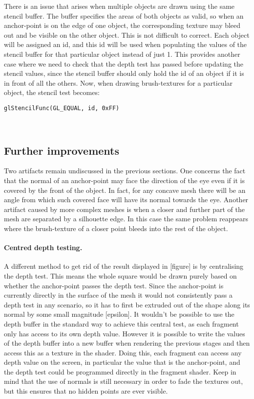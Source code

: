 \documentclass[a4paper, 12pt]{article}
\begin{document}
There is an issue that arises when multiple objects are drawn using the same stencil buffer. The buffer specifies the areas of both objects as valid, so when an anchor-point is on the edge of one object, the corresponding texture may bleed out and be visible on the other object. This is not difficult to correct. Each object will be assigned an id, and this id will be used when populating the values of the stencil buffer for that particular object instead of just 1. This provides another case where we need to check that the depth test has passed before updating the stencil values, since the stencil buffer should only hold the id of an object if it is in front of all the others. Now, when drawing brush-textures for a particular object, the stencil test becomes:\\
\centerline{\texttt{glStencilFunc(GL\_EQUAL, id, 0xFF)\;}}\\


\subsection{Further improvements}
Two artifacts remain undiscussed in the previous sections. One concerns the fact that the normal of an anchor-point may face the direction of the eye even if it is covered by the front of the object. In fact, for any concave mesh there will be an angle from which such covered face will have its normal towards the eye. Another artifact caused by more complex meshes is when a closer and further part of the mesh are separated by a silhouette edge. In this case the same problem reappears where the brush-texture of a closer point bleeds into the rest of the object.

\paragraph{Centred depth testing.}
A different method to get rid of the result displayed in [figure] is by centralising the depth test. This means the whole square would be drawn purely based on whether the anchor-point passes the depth test. Since the anchor-point is currently directly in the surface of the mesh it would not consistently pass a depth test in any scenario, so it has to first be extruded out of the shape along its normal by some small magnitude [epsilon]. It wouldn't be possible to use the depth buffer in the standard way to achieve this central test, as each fragment only has access to its own depth value. However it is possible to write the values of the depth buffer into a new buffer when rendering the previous stages and then access this as a texture in the shader. Doing this, each fragment can access any depth value on the screen, in particular the value that is the anchor-point, and the depth test could be programmed directly in the fragment shader. Keep in mind that the use of normals is still necessary in order to fade the textures out, but this ensures that no hidden points are ever visible.
\end{document}

